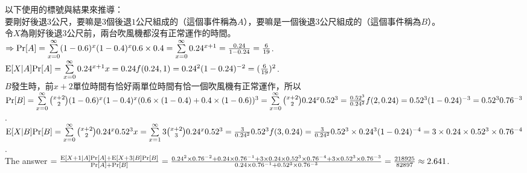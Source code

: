 \begin{pr}
以下使用的標號與結果來推導：\\
要剛好後退$3$公尺，要嘛是$3$個後退$1$公尺組成的（這個事件稱為$A$），要嘛是一個後退$3$公尺組成的（這個事件稱為$B$）。\\
令$X$為剛好後退$3$公尺前，兩台吹風機都沒有正常運作的時間。\\
$\Rightarrow\mathrm{Pr}[A]=\sum\limits_{x=0}^\infty(1-0.6)^x(1-0.4)^x0.6\times0.4=\sum\limits_{x=0}^\infty0.24^{x+1}=\frac{0.24}{1-0.24}=\frac6{19}$.\\
$\mathrm{E}[X|A]\mathrm{Pr}[A]=\sum\limits_{x=0}^\infty0.24^{x+1}x=0.24f(0.24, 1)=0.24^2(1-0.24)^{-2}=(\frac6{19})^2$.\\
$B$發生時，前$x+2$單位時間有恰好兩單位時間有恰一個吹風機有正常運作，所以\\
$\mathrm{Pr}[B]=\sum\limits_{x=0}^\infty\binom{x+2}2(1-0.6)^x(1-0.4)^x(0.6\times(1-0.4)+0.4\times(1-0.6))^3=\sum\limits_{x=0}^\infty\binom{x+2}20.24^x0.52^3=\frac{0.52^3}{0.24^2}f(2, 0.24)=0.52^3(1-0.24)^{-3}=0.52^30.76^{-3}$.\\
$\mathrm{E}[X|B]\mathrm{Pr}[B]=\sum\limits_{x=0}^\infty\binom{x+2}20.24^x0.52^3x=\sum\limits_{x=1}^\infty3\binom{x+2}30.24^x0.52^3=\frac3{0.24^2}0.52^3f(3, 0.24)=\frac3{0.24^2}0.52^3\times0.24^3(1-0.24)^{-4}=3\times0.24\times0.52^3\times0.76^{-4}$.\\
The answer $=\frac{\mathrm{E}[X+1|A]\mathrm{Pr}[A]+\mathrm{E}[X+3|B]\mathrm{Pr}[B]}{\mathrm{Pr}[A]+\mathrm{Pr}[B]}\\
=\frac{0.24^2\times0.76^{-2}+0.24\times0.76^{-1}+3\times0.24\times0.52^3\times0.76^{-4}+3\times0.52^3\times0.76^{-3}}{0.24\times0.76^{-1}+0.52^3\times0.76^{-3}}=\frac{218925}{82897}\approx2.641$.
\end{pr}
